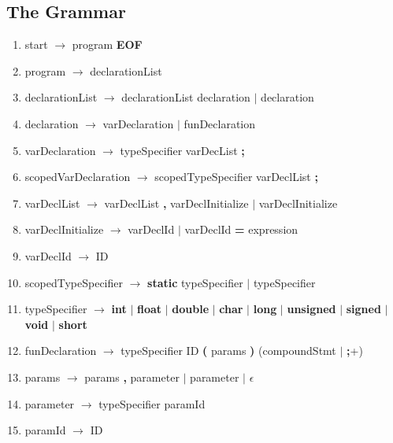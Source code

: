 \documentclass{article}
\begin{document}
\subsection{The Grammar}
\begin{enumerate}
\item start $\rightarrow$ program \textbf{EOF}
\item program $\rightarrow$ declarationList
\item declarationList $\rightarrow$ declarationList declaration $|$ declaration
\item declaration $\rightarrow$ varDeclaration $|$ funDeclaration

\item varDeclaration $\rightarrow$ typeSpecifier varDecList \textbf{;}
\item scopedVarDeclaration $\rightarrow$ scopedTypeSpecifier varDeclList \textbf{;}
\item varDeclList $\rightarrow$ varDeclList \textbf{,} varDeclInitialize $|$ varDeclInitialize
\item varDeclInitialize $\rightarrow$ varDeclId $|$ varDeclId \textbf{=} expression
\item varDeclId $\rightarrow$ ID
\item scopedTypeSpecifier $\rightarrow$ \textbf{static} typeSpecifier $|$ typeSpecifier
\item typeSpecifier $\rightarrow$ \textbf{int} $|$ \textbf{float} $|$ \textbf{double} $|$ \textbf{char} $|$ \textbf{long} $|$ \textbf{unsigned} $|$ \textbf{signed} $|$ \textbf{void} $|$ \textbf{short}

\item funDeclaration $\rightarrow$ typeSpecifier ID \textbf{(} params \textbf{)} (compoundStmt $|$ \textbf{;}+)
\item params $\rightarrow$ params \textbf{,} parameter $|$ parameter $|$ $\epsilon$
\item parameter $\rightarrow$ typeSpecifier paramId
\item paramId $\rightarrow$ ID


\end{enumerate}
\end{document}
